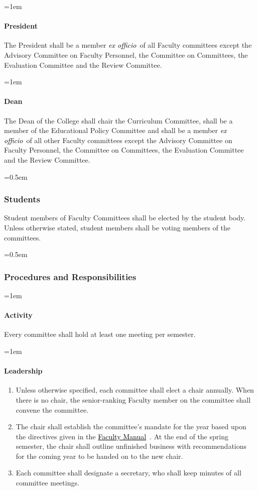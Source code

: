 \documentclass{manual}
\newcommand{\keyword}[1]{\textcolor{black}{#1}}
\newcommand{\facman}{\keyword{\underline{Faculty Manual}}~}
\newcommand{\exoff}{\keyword{\textit{ex officio}}~}
\let\oldsubsubsection\subsubsection
\renewcommand\subsubsection{\leftskip=0.5em\oldsubsubsection}
\let\oldparagraph\paragraph
\renewcommand\paragraph{\leftskip=1em\oldparagraph}
\newcommand{\itemLevelA}{\alph*.}
\newcommand{\itemRefA}{\alph*}
\begin{document}
\paragraph{President}
The President shall be a member \exoff of all Faculty committees except the Advisory Committee on Faculty Personnel, the Committee on Committees, the Evaluation Committee and the Review Committee.

\paragraph{Dean}
The Dean of the College shall chair the Curriculum Committee, shall be a member of the Educational Policy Committee and shall be a member \exoff of all other Faculty committees except the Advisory Committee on Faculty Personnel, the Committee on Committees, the Evaluation Committee and the Review Committee.

\subsubsection{Students}
Student members of Faculty Committees shall be elected by the student body. Unless otherwise stated, student members shall be voting members of the committees.

\subsubsection{Procedures and Responsibilities}
\paragraph{Activity}
Every committee shall hold at least one meeting per semester.

\paragraph{Leadership}

\begin{enumerate}[label=\itemLevelA,ref=\itemRefA]
\item Unless otherwise specified, each committee shall elect a chair annually. When there is no chair, the senior-ranking Faculty member on the committee shall convene the committee.

\item The chair shall establish the committee's mandate for the year based upon the directives given in the \facman. At the end of the spring semester, the chair shall outline unfinished business with recommendations for the coming year to be handed on to the new chair.

\item Each committee shall designate a secretary, who shall keep minutes of all committee meetings.
\end{enumerate}
\end{document}

